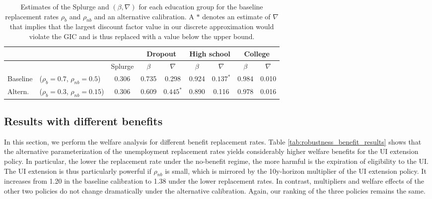 \documentclass[\PathToRoot/\ProjectName]{subfiles}
\begin{document}
\begin{table}[t]
  \begin{center}
    \small
    \begin{tabular}
      {@{}llc|cccccc@{}}
      \toprule
               &                                            &         & \multicolumn{2}{c}{Dropout} & \multicolumn{2}{c}{High school} & \multicolumn{2}{c}{College}                                    \\ \midrule
               &                                            & Splurge & $\beta$                     & $\nabla$                        & $\beta$                     & $\nabla$    & $\beta$ & $\nabla$ \\ \midrule
      Baseline & ($\rho_{b}\!=\!0.7$, $\rho_{nb}\!=\!0.5$)  & 0.306   & 0.735                       & 0.298                           & 0.924                       & $0.137^{*}$ & 0.984   & 0.010    \\
      Altern.  & ($\rho_{b}\!=\!0.3$, $\rho_{nb}\!=\!0.15$) & 0.306   & 0.609                       & $0.445^{*}$                     & 0.890                       & 0.116       & 0.978   & 0.016
      \\ \bottomrule
    \end{tabular}
  \end{center}
  \caption{Estimates of the Splurge and $(\beta,\nabla)$ for each education group for the baseline replacement rates $\rho_{b}$ and $\rho_{nb}$ and an alternative calibration.
    A $*$ denotes an estimate of $\nabla$ that implies that the largest discount factor value in our discrete approximation would violate the GIC and is thus replaced with a value below the upper bound.}
  \whenintegrated{\label{tab:robustness_benefits}} 
\end{table}

\FloatBarrier
\subsection*{Results with different benefits}
\whenintegrated{\label{sec:robust_benefits_results}} 

In this section, we perform the welfare analysis for different benefit replacement rates.
Table \ref{tab:robustness_benefit_results} shows that the alternative parameterization of the unemployment replacement rates yields considerably higher welfare benefits for the UI extension policy.
In particular, the lower the replacement rate under the no-benefit regime, the more harmful is the expiration of eligibility to the UI.
The UI extension is thus particularly powerful if $\rho_{nb}$ is small, which is mirrored by the 10y-horizon multiplier of the UI extension policy.
It increases from 1.20 in the baseline calibration to 1.38 under the lower replacement rates.
In contrast, multipliers and welfare effects of the other two policies do not change dramatically under the alternative calibration.
Again, our ranking of the three policies remains the same.
\end{document}
